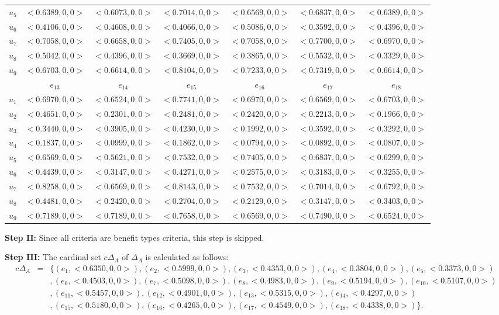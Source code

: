 \documentclass{IJFS}
\begin{document}
\begin{table}[!h]
{\begin{center}
\begin{tabular}{c|c c c c c c}
 $u_5$&   $<0.6389,0,0>$ & $<0.6073,0,0>$ &  $<0.7014,0,0>$ &$<0.6569,0,0>$ &$<0.6837,0,0>$ &$<0.6389,0,0>$\\
 $u_6$&   $<0.4106,0,0>$  & $<0.4608,0,0>$ & $<0.4066,0,0>$ &$<0.5086,0,0>$ &$<0.3592,0,0>$ &$<0.4396,0,0>$\\ 
  $u_7$&  $<0.7058,0,0>$ & $<0.6658,0,0>$ & $<0.7405,0,0>$ &$<0.7058,0,0>$ &$<0.7700,0,0>$ &$<0.6970,0,0>$\\ 
  $u_8$&   $<0.5042,0,0>$ &  $<0.4396,0,0>$ & $<0.3669,0,0>$ &$<0.3865,0,0>$ &$<0.5532,0,0>$ &$<0.3329,0,0>$\\
   $u_9$&   $<0.6703,0,0>$ & $<0.6614,0,0>$ & $<0.8104,0,0>$ &$<0.7233,0,0>$ &$<0.7319,0,0>$ &$<0.6614,0,0>$  
   \\  \hline  & $e_{13}$ &$e_{14}$ &$e_{15}$  &$e_{16}$ & $e_{17}$   &$e_{18}$ \\ \hline 
   $u_1$ &  $<0.6970,0,0>$ &  $<0.6524,0,0>$ & $<0.7741,0,0>$ & $<0.6970,0,0>$ &$<0.6569,0,0>$&$<0.6703,0,0>$\\
 $u_2$& $<0.4651,0,0>$   & $<0.2301,0,0>$ & $<0.2481,0,0>$ &$<0.2420,0,0>$ &$<0.2213,0,0>$ &$<0.1966,0,0>$\\ 
 $u_3$&   $<0.3440,0,0>$ & $<0.3905,0,0>$ & $<0.4230,0,0>$ &$<0.1992,0,0>$ &$<0.3592,0,0>$ &$<0.3292,0,0>$\\
 $u_4$&   $<0.1837,0,0>$  &  $<0.0999,0,0>$ & $<0.1862,0,0>$ &$<0.0794,0,0>$ &$<0.0892,0,0>$ &$<0.0807,0,0>$\\ 
 $u_5$&   $<0.6569,0,0>$ & $<0.5621,0,0>$ &  $<0.7532,0,0>$ &$<0.7405,0,0>$ &$<0.6837,0,0>$ &$<0.6299,0,0>$\\
 $u_6$&   $<0.4439,0,0>$  & $<0.3147,0,0>$ & $<0.4271,0,0>$ &$<0.2575,0,0>$ &$<0.3183,0,0>$ &$<0.3255,0,0>$\\ 
  $u_7$&  $<0.8258,0,0>$ & $<0.6569,0,0>$ & $<0.8143,0,0>$ &$<0.7532,0,0>$ &$<0.7014,0,0>$ &$<0.6792,0,0>$\\ 
  $u_8$&   $<0.4481,0,0>$ &  $<0.2420,0,0>$ & $<0.2704,0,0>$ &$<0.2129,0,0>$ &$<0.3147,0,0>$ &$<0.3403,0,0>$\\
   $u_9$&   $<0.7189,0,0>$ & $<0.7189,0,0>$ & $<0.7658,0,0>$ &$<0.6569,0,0>$ &$<0.7490,0,0>$ &$<0.6524,0,0>$ 
   \end{tabular}\end{center}}
\end{table}

\textbf{Step II:} Since all criteria are benefit types criteria, this step is skipped.

\textbf{Step III:} The cardinal set $c\Delta_A$ of $\Delta_A$ is
calculated as follows:
\begin{eqnarray*} c\Delta_A &=&\{(e_1, <0.6350,0,0>), (e_2,<0.5999,0,0>), (e_3,<0.4353,0,0>), (e_4, <0.3804,0,0>),(e_5, <0.3373,0,0>)\\&&  , (e_6, <0.4503,0,0>) ,(e_7, <0.5098,0,0>), (e_8, <0.4983,0,0>), (e_9, <0.5194,0,0>), (e_{10}, <0.5107,0,0>)\\&& , (e_{11}, <0.5457,0,0>), (e_{12}, <0.4901,0,0>), (e_{13}, <0.5315,0,0>), (e_{14}, <0.4297,0,0>)\\&&, (e_{15}, <0.5180,0,0>)  ,(e_{16}, <0.4265,0,0>) , (e_{17}, <0.4549,0,0>), (e_{18}, <0.4338,0,0>)\}.
\end{eqnarray*}
\end{document}
